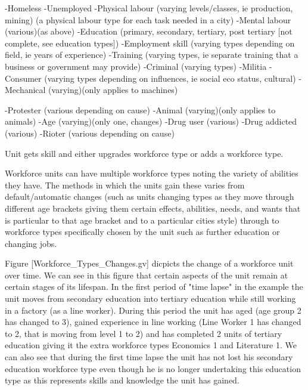 -Homeless
-Unemployed
-Physical labour (varying levels/classes, ie production, mining)
	(a physical labour type for each task needed in a city) 
-Mental labour (various)(as above)
-Education (primary, secondary, tertiary, post tertiary [not complete, see education types])
-Employment skill (varying types depending on field, ie years of experience)
-Training (varying types, ie separate training that a business or government may provide)
-Criminal (varying types)
-Militia
-Consumer (varying types depending on influences, ie social eco status, cultural)
-Mechanical (varying)(only applies to machines)

-Protester (various depending on cause)
-Animal (varying)(only applies to animals)
-Age (varying)(only one, changes)
-Drug user (various)
-Drug addicted (various)
-Rioter (various depending on cause)



Unit gets skill and either upgrades workforce type or adds a workforce type.

Workforce units can have multiple workforce types noting the variety of abilities they have. The methods in which the units gain these varies from default/automatic changes (such as units changing types as they move through different age brackets giving them certain effects, abilities, needs, and wants that is particular to that age bracket and to a particular cities style) through to workforce types specifically chosen by the unit such as further education or changing jobs. 

Figure [Workforce_Types_Changes.gv] dicpicts the change of a workforce unit over time. We can see in this figure that certain aspects of the unit remain at certain stages of its lifespan. In the first period of "time lapse" in the example the unit moves from secondary education into tertiary education while still working in a factory (as a line worker). During this period the unit has aged (age group 2 has changed to 3), gained experience in line working (Line Worker 1 has changed to 2, that is moving from level 1 to 2) and has completed 2 units of tertiary education giving it the extra workforce types Economics 1 and Literature 1. We can also see that during the first time lapse the unit has not lost his secondary education workforce type even though he is no longer undertaking this education type as this represents skills and knowledge the unit has gained. 

